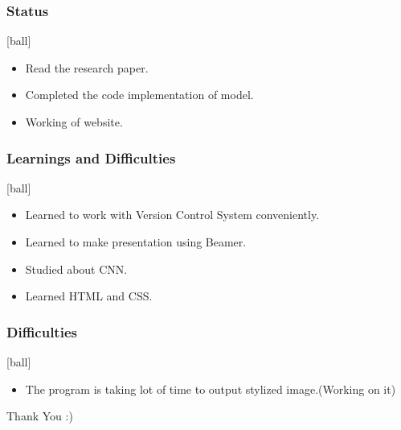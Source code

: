 \documentclass[14pt]{beamer}
\begin{document}
\begin{frame}
		\frametitle{Status}
		\begin{itemize}
		\item Read the research paper.
		\item Completed the code implementation of model.
        \item Working of website.
		\end{itemize}
\end{frame}

\begin{frame}
		\frametitle{Learnings and Difficulties}
        \begin{itemize}
		\item Learned to work with Version Control System conveniently.
		\item Learned to make presentation using Beamer.
		\item Studied about CNN.
        \item Learned HTML and CSS.
		\end{itemize}
\end{frame}

\begin{frame}
		\frametitle{Difficulties}
        \begin{itemize}
				\item The program is taking lot of time to output stylized image.(Working on it)
		\end{itemize}
\end{frame}

\begin{frame}
	                              	Thank You :)
\end{frame}
\end{document}
